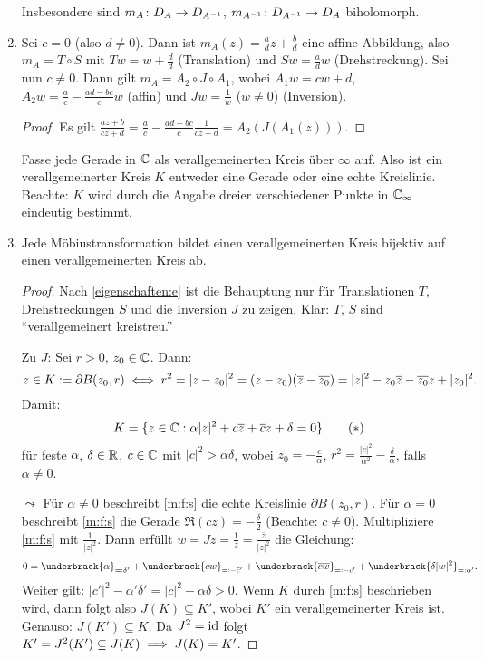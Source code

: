 \documentclass[a4paper,twoside,DIV15,BCOR12mm]{scrbook}
\begin{document}
\begin{enumerate}
Insbesondere sind $m_A\colon D_A\rightarrow D_{A^{-1}}$, $m_{A^{-1}}\colon D_{A^{-1}}\rightarrow D_A$ biholomorph.
\item\label{eigenschaften:e} Sei $c=0$ (also $d\neq0$). Dann ist $m_A(z) = \frac{a}{d}z + \frac{b}{d}$ eine affine Abbildung, also $m_A = T \circ S$
  mit $Tw=w+\frac{d}{d}$ (Translation) und $Sw = \frac{a}{d}w$ (Drehstreckung). Sei nun $c\neq0$. Dann gilt $m_A = A_2 \circ J
  \circ A_1$, wobei $A_1w = cw+d$, $A_2w = \frac{a}{c} - \frac{ad-bc}{c}w$ (affin) und $Jw = \frac1w$ ($w\neq0$) (Inversion).
  \begin{proof}
    Es gilt $\displaystyle\frac{az+b}{cz+d} = \frac{a}{c} - \frac{ad-bc}{c}\frac{1}{cz+d} = A_2(J(A_1(z)))$.
  \end{proof}
Fasse jede Gerade in $\mathbb{C}$ als verallgemeinerten Kreis über $\infty$ auf. Also ist ein verallgemeinerter Kreis $K$ entweder eine Gerade oder eine echte Kreislinie. Beachte: $K$ wird durch die Angabe dreier verschiedener Punkte in $\mathbb{C}_\infty$ eindeutig bestimmt.
\item\label{eigenschaften:f} Jede Möbiustransformation bildet einen verallgemeinerten Kreis bijektiv auf einen verallgemeinerten Kreis ab.
\begin{proof} Nach \ref{eigenschaften:e}
 ist die Behauptung nur für Translationen $T$, Drehstreckungen $S$ und die Inversion $J$ zu zeigen. Klar: $T$, $S$ sind ``verallgemeinert kreistreu.''

Zu $J$: Sei $r>0$, $z_0\in\mathbb{C}$. Dann:
\[z\in K:= \partial B(z_0,r)\iff r^2 = |z-z_0|^2 = (z-z_0)(\overline{z}-\overline{z_0}) = |z|^2-z_0\overline{z}-\overline{z_0}z+|z_0|^2.\]
Damit: 
\[\label{m:f:s}K=\{z\in\mathbb{C}: \alpha|z|^2+c\overline{z}+\overline{c}z+\delta = 0\}\tag{$*$}\]
für feste $\alpha$, $\delta\in\mathbb{R}$, $c\in\mathbb{C}$ mit $|c|^2>\alpha\delta$, wobei $z_0=-\frac{c}{\alpha}$, $r^2=\frac{|c|^2}{\alpha^2}-\frac{\delta}{\alpha}$, falls $\alpha\neq 0$.

$\leadsto$ Für $\alpha\neq 0$ beschreibt \eqref{m:f:s} die echte Kreislinie $\partial B(z_0,r)$. Für $\alpha = 0$ beschreibt \eqref{m:f:s} die Gerade $\Re(\bar{c}z) = -\frac{\delta}{2}$ (Beachte: $c\neq 0$). Multipliziere \eqref{m:f:s} mit $\frac{1}{|z|^2}$. Dann erfüllt $w = Jz = \frac{1}{z} = \frac{\bar{z}}{|z|^2}$ die Gleichung:
\[ 0 = \underbrack{\alpha}_{\ad\delta'} + \underbrack{cw}_{\ad -\bar{c}'} + \underbrack{\bar{c}\bar{w}}_{\ad -c'} + \underbrack{\delta|w|^2}_{\ad\alpha'}.\]
Weiter gilt: $|c'|^2-\alpha'\delta' = |c|^2-\alpha\delta > 0$. Wenn $K$ durch \eqref{m:f:s} beschrieben wird, dann folgt also $J(K)\subseteq K'$, wobei $K'$ ein verallgemeinerter Kreis ist. Genauso: $J(K')\subseteq K$. Da $J^2 = \mathrm{id}$ folgt $K'=J^2(K')\subseteq J(K)\implies J(K)=K'$.
\end{proof}
\end{enumerate}
\end{document}
